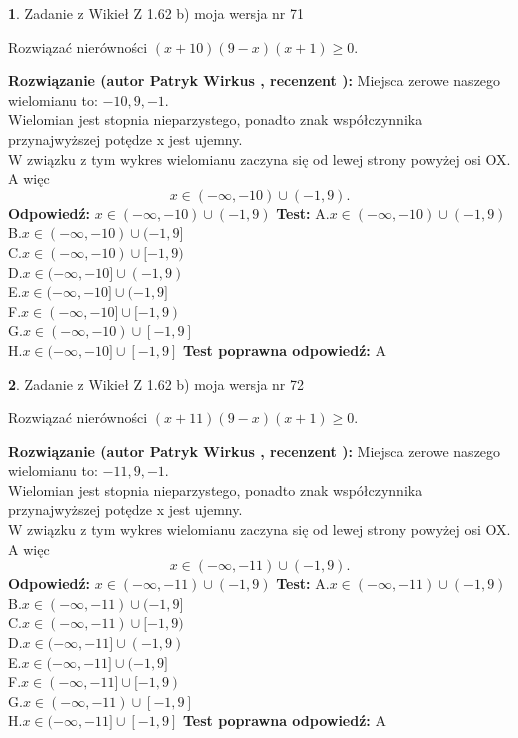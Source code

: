 \documentclass[12pt, a4paper]{article}
\theoremstyle{definition} %
\newtheorem{zad}{}
\newcommand{\zadStart}[1]{\begin{zad}#1\newline}
\newcommand{\zadStop}{\end{zad}}
\newcommand{\rozwStart}[2]{\noindent \textbf{Rozwiązanie (autor #1 , recenzent #2): }\newline}
\newcommand{\rozwStop}{\newline}
\newcommand{\odpStart}{\noindent \textbf{Odpowiedź:}\newline}
\newcommand{\odpStop}{\newline}
\newcommand{\testStart}{\noindent \textbf{Test:}\newline}
\newcommand{\testStop}{\newline}
\newcommand{\kluczStart}{\noindent \textbf{Test poprawna odpowiedź:}\newline}
\newcommand{\kluczStop}{\newline}
\begin{document}
\zadStart{Zadanie z Wikieł Z 1.62 b) moja wersja nr 71}

Rozwiązać nierówności $(x+10)(9-x)(x+1)\ge0$.
\zadStop
\rozwStart{Patryk Wirkus}{}
Miejsca zerowe naszego wielomianu to: $-10, 9, -1$.\\
Wielomian jest stopnia nieparzystego, ponadto znak współczynnika przy\linebreak najwyższej potędze x jest ujemny.\\ W związku z tym wykres wielomianu zaczyna się od lewej strony powyżej osi OX. A więc $$x \in (-\infty,-10) \cup (-1,9).$$
\rozwStop
\odpStart
$x \in (-\infty,-10) \cup (-1,9)$
\odpStop
\testStart
A.$x \in (-\infty,-10) \cup (-1,9)$\\
B.$x \in (-\infty,-10) \cup (-1,9]$\\
C.$x \in (-\infty,-10) \cup [-1,9)$\\
D.$x \in (-\infty,-10] \cup (-1,9)$\\
E.$x \in (-\infty,-10] \cup (-1,9]$\\
F.$x \in (-\infty,-10] \cup [-1,9)$\\
G.$x \in (-\infty,-10) \cup [-1,9]$\\
H.$x \in (-\infty,-10] \cup [-1,9]$
\testStop
\kluczStart
A
\kluczStop



\zadStart{Zadanie z Wikieł Z 1.62 b) moja wersja nr 72}

Rozwiązać nierówności $(x+11)(9-x)(x+1)\ge0$.
\zadStop
\rozwStart{Patryk Wirkus}{}
Miejsca zerowe naszego wielomianu to: $-11, 9, -1$.\\
Wielomian jest stopnia nieparzystego, ponadto znak współczynnika przy\linebreak najwyższej potędze x jest ujemny.\\ W związku z tym wykres wielomianu zaczyna się od lewej strony powyżej osi OX. A więc $$x \in (-\infty,-11) \cup (-1,9).$$
\rozwStop
\odpStart
$x \in (-\infty,-11) \cup (-1,9)$
\odpStop
\testStart
A.$x \in (-\infty,-11) \cup (-1,9)$\\
B.$x \in (-\infty,-11) \cup (-1,9]$\\
C.$x \in (-\infty,-11) \cup [-1,9)$\\
D.$x \in (-\infty,-11] \cup (-1,9)$\\
E.$x \in (-\infty,-11] \cup (-1,9]$\\
F.$x \in (-\infty,-11] \cup [-1,9)$\\
G.$x \in (-\infty,-11) \cup [-1,9]$\\
H.$x \in (-\infty,-11] \cup [-1,9]$
\testStop
\kluczStart
A
\kluczStop
\end{document}
